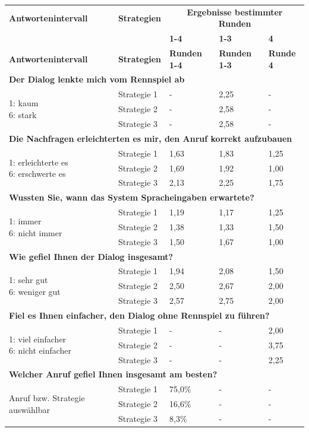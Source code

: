 \documentclass[12pt,a4paper]{scrartcl}
\begin{document}
\begin{longtable}{|p{4cm}|p{2cm}|p{2cm}|p{2cm}|p{2cm}|}
	\hline
		\textbf{Antwortenintervall}&\textbf{Strategien}&\multicolumn{3}{c|}{\textbf{Ergebnisse bestimmter Runden}}\\
	&&\textbf{1-4}&\textbf{1-3} &\textbf{4}\\
	\hline
	\endfirsthead
	\hline
	\textbf{Antwortenintervall}&\textbf{Strategien}&\textbf{Runden 1-4}&\textbf{Runden 1-3} &\textbf{Runde 4}\\
	\hline
	\endhead
		\multicolumn{5}{l}{\textbf{Der Dialog lenkte mich vom Rennspiel ab}}\\
		\hline
\multirow{3}{4cm}{1: kaum \newline 6: stark} & Strategie 1 & - & 2,25  & - \\
 & Strategie 2 & - & 2,58 & - \\
 & Strategie 3 & - & 2,58 & -\\
\hline
		\multicolumn{5}{l}{\textbf{Die Nachfragen erleichterten es mir, den Anruf korrekt aufzubauen}}\\
		\hline
\multirow{3}{4cm}{1: erleichterte es\newline  6: erschwerte es} & Strategie 1 & 1,63 & 1,83 & 1,25 \\
 & Strategie 2 & 1,69 & 1,92 & 1,00 \\
 & Strategie 3 & 2,13 & 2,25 & 1,75 \\
\hline
		\multicolumn{5}{l}{\textbf{Wussten Sie, wann das System Spracheingaben erwartete?}}\\
		\hline
\multirow{3}{4cm}{1: immer \newline  6: nicht immer} & Strategie 1 & 1,19 & 1,17 & 1,25 \\
 & Strategie 2 & 1,38 & 1,33 & 1,50 \\
 & Strategie 3 & 1,50 & 1,67 & 1,00 \\
\hline
		\multicolumn{5}{l}{\textbf{Wie gefiel Ihnen der Dialog insgesamt?}}\\
		\hline
\multirow{3}{4cm}{1: sehr gut \newline  6: weniger gut} & Strategie 1 & 1,94 & 2,08 & 1,50 \\
 & Strategie 2 & 2,50 & 2,67 & 2,00 \\
 & Strategie 3 & 2,57 & 2,75 & 2,00 \\
\hline
		\multicolumn{5}{l}{\textbf{Fiel es Ihnen einfacher, den Dialog ohne Rennspiel zu führen?}}\\
		\hline
\multirow{3}{4cm}{1: viel einfacher \newline  6: nicht einfacher} & Strategie 1 &  - & - & 2,00 \\
 & Strategie 2 & - & - & 3,75 \\
 & Strategie 3 & - & - & 2,25\\
\hline
		\multicolumn{5}{l}{\textbf{Welcher Anruf gefiel Ihnen insgesamt am besten?}}\\
		\hline
\multirow{3}{4cm}{Anruf bzw. Strategie auswählbar} & Strategie 1 & 75,0\% & - & - \\
 & Strategie 2 & 16,6\% & - & - \\
 & Strategie 3 & 8,3\% & - & - \\
\hline
\end{longtable}
\end{document}
